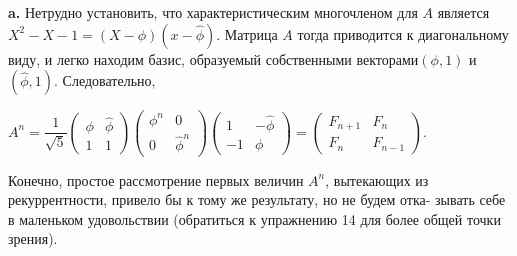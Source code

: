 \hspace*{15pt}\textbf{a.} Нетрудно установить, что характеристическим многочленом для\linebreak
$A$ является $X^2-X-1=(X-\phi)(x-\hat{\phi})$. Матрица $A$ тогда приводится к\linebreak
диагональному виду, и легко находим базис, образуемый собственными\linebreak
векторами$(\phi,1)$ и $(\hat{\phi},1)$. Следовательно,
\begin{center}
$A^n=\dfrac{1}{\sqrt{5}}\begin{pmatrix} \phi & \hat{\phi} \\ 1 & 1 \end{pmatrix}\begin{pmatrix} \phi^n & 0 \\ 0 & \hat{\phi}^n \end{pmatrix} \begin{pmatrix} 1 & -\hat{\phi} \\ -1 & \phi \end{pmatrix} = \begin{pmatrix} F_{n+1} & F_{n} \\ F_{n} & F_{n-1} \end{pmatrix}$.
\end{center}
Конечно, простое рассмотрение первых величин $A^n$, вытекающих из\linebreak
рекуррентности, привело бы к тому же результату, но не будем отка-\linebreak
зывать себе в маленьком удовольствии (обратиться к упражнению 14\linebreak
для более общей точки зрения).
\newpage


